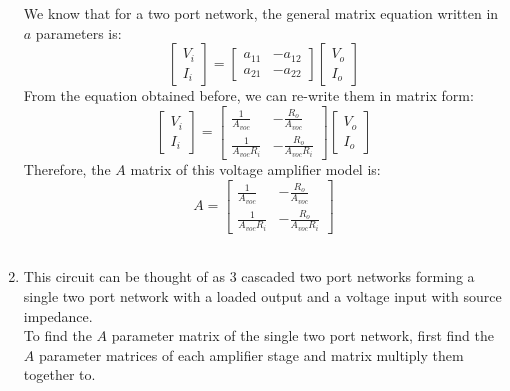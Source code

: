 \begin{enumerate}
{	We know that for a two port network, the general matrix
	equation written in $a$ parameters is:
	$$ \left[ \begin{matrix}
	V_i \\ 
	I_i
	\end{matrix}\right] = \left[ \begin{matrix}
	a_{11} & -a_{12} \\ 
	a_{21} & -a_{22}
	\end{matrix}  \right] \left[ \begin{matrix}
	V_o \\ 
	I_o
	\end{matrix}  \right]  $$	
	From the equation obtained before, we can re-write them in matrix form:
	$$ \left[ \begin{matrix}
	V_i \\ 
	I_i
	\end{matrix}\right] = \left[ \begin{matrix}
	\frac{1}{A_{voc}} 		& -\frac{R_o}{A_{voc}} \\[6pt] 
	\frac{1}{A_{voc}R_i}	& -\frac{R_o}{A_{voc}R_i}
	\end{matrix}  \right] \left[ \begin{matrix}
	V_o \\ 
	I_o
	\end{matrix}  \right]  $$	
	}
	Therefore, the $A$ matrix of this voltage amplifier model is:
	$$ A = 
	\left[ \begin{matrix}
	\frac{1}{A_{voc}} 		& -\frac{R_o}{A_{voc}} \\[6pt] 
	\frac{1}{A_{voc}R_i}	& -\frac{R_o}{A_{voc}R_i}
	\end{matrix}  \right] $$
	\\
	
	\item{
	This circuit can be thought of as 3 cascaded two port networks forming 
	a single two port network with a loaded output and a voltage input with 
	source impedance.\\
	To find the $A$ parameter matrix of the single two port network, first 
	find the $A$ parameter matrices of each amplifier stage and matrix 
	multiply them together to.
	
}
\end{enumerate}
